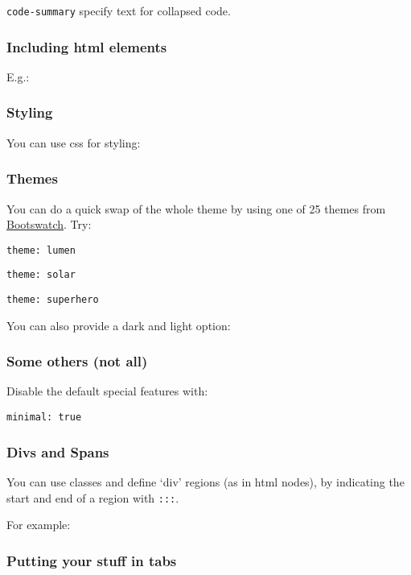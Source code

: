 \documentclass[
  letterpaper,
  DIV=11,
  numbers=noendperiod]{scrartcl}
\begin{document}
\texttt{code-summary} specify text for collapsed code.

\hypertarget{including-html-elements}{%
\subsubsection{Including html elements}\label{including-html-elements}}

E.g.:

\hypertarget{styling}{%
\subsubsection{Styling}\label{styling}}

You can use css for styling:

\hypertarget{themes}{%
\subsubsection{Themes}\label{themes}}

You can do a quick swap of the whole theme by using one of 25 themes
from \href{https://bootswatch.com/}{Bootswatch}. Try:

\texttt{theme:\ lumen}

\texttt{theme:\ solar}

\texttt{theme:\ superhero}

You can also provide a dark and light option:

\hypertarget{some-others-not-all}{%
\subsubsection{Some others (not all)}\label{some-others-not-all}}

Disable the default special features with:

\texttt{minimal:\ true}

\hypertarget{divs-and-spans}{%
\subsubsection{Divs and Spans}\label{divs-and-spans}}

You can use classes and define `div' regions (as in html nodes), by
indicating the start and end of a region with \texttt{:::}.

For example:

\hypertarget{putting-your-stuff-in-tabs}{%
\subsubsection{Putting your stuff in
tabs}\label{putting-your-stuff-in-tabs}}
\end{document}
